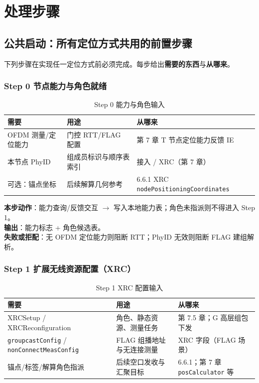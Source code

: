 \documentclass[11pt,a4paper]{ctexart}
\begin{document}
\section{处理步骤}

\setcounter{secnumdepth}{4}


\subsection{公共启动：所有定位方式共用的前置步骤}

下列步骤在实现任一定位方式前必须完成。每步给出\textbf{需要的东西}与\textbf{从哪来}。

\subsubsection{Step 0 节点能力与角色就绪}


\begin{longtable}{L{3.4cm}L{4.8cm}L{4.8cm}}
\caption{Step 0 能力与角色输入\label{tab:step0-in}} \\
\toprule
\textbf{需要} & \textbf{用途} & \textbf{从哪来} \\
\midrule
OFDM 测量/定位能力 & 门控 RTT/FLAG 配置 & 第 7 章 T 节点定位能力反馈 IE \\
本节点 PhyID & 组成员标识与顺序表索引 & 接入 / XRC（第 7 章） \\
可选：锚点坐标 & 后续解算几何参考 & 6.6.1 XRC \texttt{nodePositioningCoordinates} \\
\bottomrule
\end{longtable}

\textbf{本步动作}：能力查询/反馈交互 $\rightarrow$ 写入本地能力表；角色未指派则不得进入 Step 1。\\
\textbf{输出}：能力标志 + 角色候选表。\\
\textbf{失败或拒配}：无 OFDM 定位能力则阻断 RTT；PhyID 无效则阻断 FLAG 建组解析。

\subsubsection{Step 1 扩展无线资源配置（XRC）}


\begin{longtable}{L{3.4cm}L{4.8cm}L{4.8cm}}
\caption{Step 1 XRC 配置输入\label{tab:step1-in}} \\
\toprule
\textbf{需要} & \textbf{用途} & \textbf{从哪来} \\
\midrule
XRCSetup / XRCReconfiguration & 角色、静态资源、测量任务 & 第 7.5 章；G 高层组包下发 \\
\texttt{groupcastConfig} / \texttt{nonConnectMeasConfig} & FLAG 组播地址与无连接测量 & XRC 字段（FLAG 场景） \\
锚点/标签/解算角色指派 & 后续空口发收与汇聚目标 & 6.6.1；第 7 章 \texttt{posCalculator} 等 \\
\bottomrule
\end{longtable}
\end{document}
